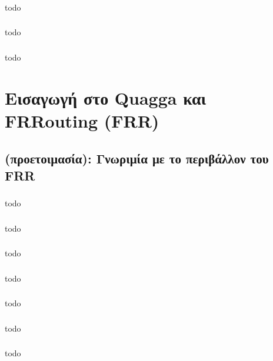 \documentclass[a4paper, 12pt]{article}
\begin{document}
		\subsubsection{}
			todo

		\subsubsection{}
			todo

		\subsubsection{}
			todo

\section{Εισαγωγή στο Quagga και FRRouting (FRR)}

	\subsection{(προετοιμασία): Γνωριμία με το περιβάλλον του FRR}

		\subsubsection{}
			todo

		\subsubsection{}
			todo

		\subsubsection{}
			todo

		\subsubsection{}
			todo

		\subsubsection{}
			todo

		\subsubsection{}
			todo

		\subsubsection{}
			todo
\end{document}
